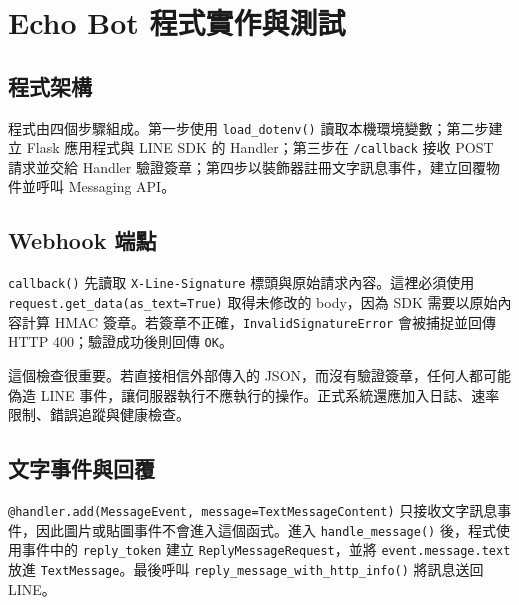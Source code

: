 \chapter{Echo Bot 程式實作與測試}

\section{程式架構}
程式由四個步驟組成。第一步使用 \texttt{load\_dotenv()} 讀取本機環境變數；第二步建立 Flask 應用程式與 LINE SDK 的 Handler；第三步在 \texttt{/callback} 接收 POST 請求並交給 Handler 驗證簽章；第四步以裝飾器註冊文字訊息事件，建立回覆物件並呼叫 Messaging API。

\section{Webhook 端點}
\texttt{callback()} 先讀取 \texttt{X-Line-Signature} 標頭與原始請求內容。這裡必須使用 \texttt{request.get\_data(as\_text=True)} 取得未修改的 body，因為 SDK 需要以原始內容計算 HMAC 簽章。若簽章不正確，\texttt{InvalidSignatureError} 會被捕捉並回傳 HTTP 400；驗證成功後則回傳 \texttt{OK}。

這個檢查很重要。若直接相信外部傳入的 JSON，而沒有驗證簽章，任何人都可能偽造 LINE 事件，讓伺服器執行不應執行的操作。正式系統還應加入日誌、速率限制、錯誤追蹤與健康檢查。

\section{文字事件與回覆}
\texttt{@handler.add(MessageEvent, message=TextMessageContent)} 只接收文字訊息事件，因此圖片或貼圖事件不會進入這個函式。進入 \texttt{handle\_message()} 後，程式使用事件中的 \texttt{reply\_token} 建立 \texttt{ReplyMessageRequest}，並將 \texttt{event.message.text} 放進 \texttt{TextMessage}。最後呼叫 \texttt{reply\_message\_with\_http\_info()} 將訊息送回 LINE。

